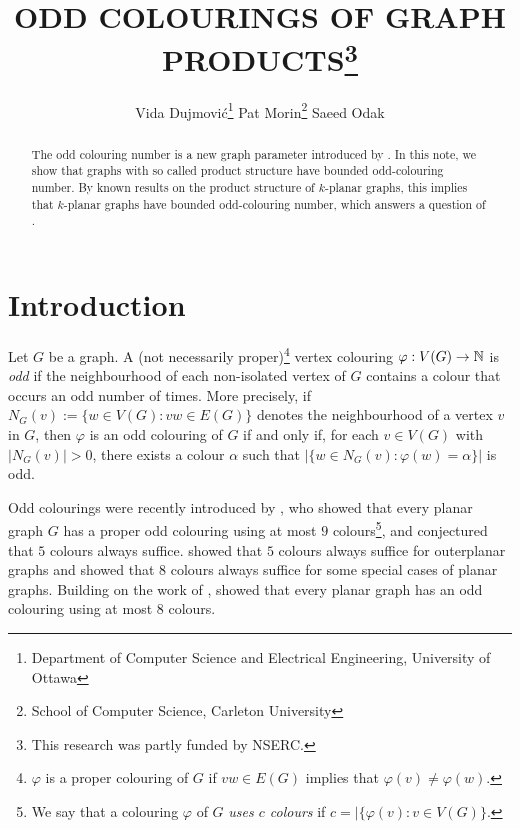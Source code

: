 \documentclass{patmorin}
\title{\MakeUppercase{Odd Colourings of Graph Products}\thanks{This research was partly funded by NSERC.}}
\author{%
  Vida Dujmović\thanks{Department of Computer Science and Electrical Engineering, University of Ottawa}\qquad
  Pat Morin\thanks{School of Computer Science, Carleton University}\qquad
  Saeed Odak\footnotemark[2]
}
\date{}
\begin{document}
\maketitle

\begin{abstract}
  The odd colouring number is a new graph parameter introduced by \citet{petrusevski.skrekovski:colorings}.  In this note, we show that graphs with so called product structure have bounded odd-colouring number. By known results on the product structure of $k$-planar graphs, this implies that $k$-planar graphs have bounded odd-colouring number, which answers a question of \citet{cranston.lafferty.ea:note}.
\end{abstract}

%

\section{Introduction}

Let $G$ be a graph.  A (not necessarily proper)\footnote{$\varphi$ is a proper colouring of $G$ if $vw\in E(G)$ implies that $\varphi(v)\neq\varphi(w)$.} vertex colouring $\varphi:V(G)\to\mathbb{N}$ is \emph{odd} if the neighbourhood of each non-isolated vertex of $G$ contains a colour that occurs an odd number of times.  More precisely, if $N_G(v):=\{w\in V(G):vw\in E(G)\}$ denotes the neighbourhood of a vertex $v$ in $G$, then $\varphi$ is an odd colouring of $G$ if and only if, for each $v\in V(G)$ with $|N_G(v)|>0$, there exists a colour $\alpha$ such that $|\{w\in N_G(v): \varphi(w)=\alpha\}|$ is odd.

Odd colourings were recently introduced by \citet{petrusevski.skrekovski:colorings}, who showed that every planar graph $G$ has a proper odd colouring using at most $9$ colours\footnote{We say that a colouring $\varphi$ of $G$ \emph{uses $c$ colours} if $c=|\{\varphi(v):v\in V(G)\}$.}, and conjectured that $5$ colours always suffice.  \citet{caro.petrusevski.ea:remarks} showed that $5$ colours always suffice for outerplanar graphs and showed that $8$ colours always suffice for some special cases of planar graphs.  Building on the work of \citet{caro.petrusevski.ea:remarks}, \citet{petr.portier:odd} showed that every planar graph has an odd colouring using at most $8$ colours.
\end{document}

